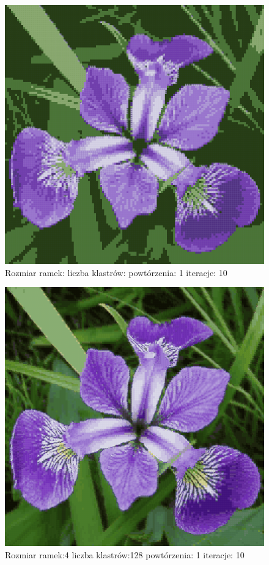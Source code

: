\documentclass{classrep}
\begin{document}
{{{{                    \begin{figure}[!htbp]
                        \centering
                        \includegraphics[width=\textwidth,width=90mm]{obrazy/iris_R4_K12_P1_It10.png}
                        \caption{Rozmiar ramek: liczba klastrów: powtórzenia: 1 iteracje: 10 }
                    \end{figure}

                    \begin{figure}[!htbp]
                        \centering
                        \includegraphics[width=\textwidth,width=90mm]{obrazy/iris_R4_K128_P1_It10.png}
                        \caption{Rozmiar ramek:4 liczba klastrów:128 powtórzenia: 1 iteracje: 10 }
                    \end{figure}

}}}}
\end{document}
